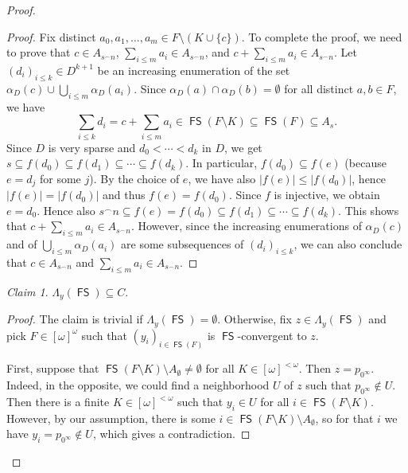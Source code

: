 \documentclass{amsart}
\theoremstyle{plain}
\theoremstyle{definition}
\theoremstyle{remark}
\newtheorem{claim}{Claim}
\DeclareMathOperator{\FS}{\mathsf{FS}}
\begin{document}
\begin{proof}
\begin{proof}
Fix distinct $a_0,a_1,\ldots,a_m\in F\setminus (K\cup\{c\})$. To complete the proof, we need to prove that $c\in  A_{s^\frown n}$, $\sum_{i\leq m}a_i\in A_{s^\frown n}$, and $c+\sum_{i\leq m}a_i\in A_{s^\frown n}$. Let $(d_i)_{i\leq k}\in D^{k+1}$ be an increasing enumeration of the set $\alpha_D(c)\cup\bigcup_{i\leq m}\alpha_D(a_i)$. Since $\alpha_D(a)\cap\alpha_D(b)=\emptyset$ for all distinct $a,b\in F$, we have 
\begin{equation*}
\sum_{i\leq k} d_i=c+\sum_{i\leq m}a_i\in\FS(F\setminus K)\subseteq\FS(F)\subseteq A_s.
\end{equation*}
Since $D$ is very sparse and $d_0<\cdots<d_k$ in $D$, we get $s\subseteq f(d_0)\subseteq f(d_1)\subseteq\cdots\subseteq f(d_k)$. 
In particular, $f(d_0)\subseteq f(e)$ (because $e=d_j$ for some $j$). By the choice of $e$, we have also $|f(e)|\le |f(d_0)|$, hence $|f(e)|=|f(d_0)|$ and thus $f(e)=f(d_0)$. Since $f$ is injective, we obtain $e=d_0$.  
Hence also $s^\frown n\subseteq f(e)=f(d_0)\subseteq f(d_1)\subseteq\cdots\subseteq f(d_k)$. This shows that $c+\sum_{i\leq m}a_i\in A_{s^\frown n}$. However, since the increasing enumerations of $\alpha_D(c)$ and of $\bigcup_{i\leq m}\alpha_D(a_i)$ are some subsequences of $(d_i)_{i\leq k}$, we can also conclude that $c\in  A_{s^\frown n}$ and $\sum_{i\leq m}a_i\in A_{s^\frown n}$. 
\end{proof}

\begin{claim}\label{claim:inclusionB2}
    $\Lambda_y(\FS)\subseteq C$.
\end{claim}
\begin{proof}
The claim is trivial if $\Lambda_y(\FS)=\emptyset$. Otherwise, fix $z \in \Lambda_y(\FS)$ and pick $F\in[\omega]^\omega$ such that $(y_{i})_{i\in\FS(F)}$  
is $\FS$-convergent to $z$. 

First, suppose that $\FS(F\setminus K)\setminus A_\emptyset\neq\emptyset$ for all $K\in[\omega]^{<\omega}$. Then $z=p_{0^\infty}$. Indeed, in the opposite, we could find a neighborhood $U$ of $z$ such that $p_{0^\infty}\notin U$. Then there is a finite $K\in[\omega]^{<\omega}$ such that $y_{i}\in U$ for all $i\in\FS(F\setminus K)$. However, by our assumption, there is some $i\in\FS(F\setminus K)\setminus A_\emptyset$, so for that $i$ we have $y_{i}=p_{0^\infty}\notin U$, which gives a contradiction.


\end{proof}
\end{proof}
\end{document}
